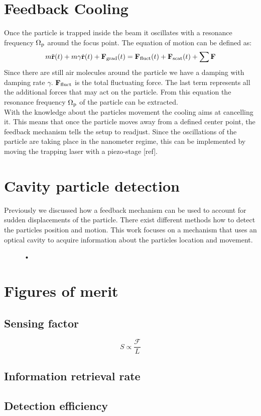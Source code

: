 \section{Feedback Cooling}
Once the particle is trapped inside the beam it oscillates with a resonance frequency $\de{\Omega}{p}$ around the focus point. The equation of motion can be defined as:
\begin{equation}
	m\ddot{\vc{r}}(t)+m\gamma\dot{\vc{r}}(t)+\field{F}{grad}(t)=\field{F}{fluct}(t)+\field{F}{scat}(t)+\sum\limits\vc{F}
\end{equation}
Since there are still air molecules around the particle we have a damping with damping rate $\gamma$. $\field{F}{fluct}$ is the total fluctuating force. The last term represents all the additional forces that may act on the particle. From this equation the resonance frequency $\de{\Omega}{p}$ of the particle can be extracted.\\
With the knowledge about the particles movement the cooling aims at cancelling it. This means that once the particle moves away from a defined center point, the feedback mechanism tells the setup to readjust. Since the oscillations of the particle are taking place in the nanometer regime, this can be implemented by moving the trapping laser with a piezo-stage [ref].

\section{Cavity particle detection}
Previously we discussed how a feedback mechanism can be used to account for sudden displacements of the particle. There exist different methods how to detect the particles position and motion. This work focuses on a mechanism that uses an optical cavity to acquire information about the particles location and movement.\\
\begin{figure}[H]
	
	\caption{•}
\end{figure}


\section{Figures of merit}

\subsection{Sensing factor}\label{ChapSensingFactor}
\begin{equation}\label{EqSensingFactor}
	S\propto\frac{\mathcal{F}}{L}
\end{equation}

\subsection{Information retrieval rate}\label{ChapInformationRetrievalRate}

\subsection{Detection efficiency}
